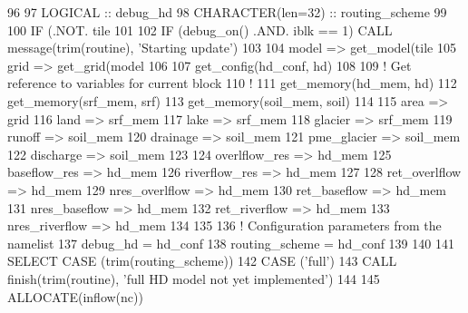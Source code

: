 \begin{DoxyCode}
96 
97     \textcolor{keywordtype}{LOGICAL}           :: debug\_hd
98     \textcolor{keywordtype}{CHARACTER(len=32)} :: routing\_scheme
99 
100     \textcolor{keywordflow}{IF} (.NOT. tile%
101 
102     \textcolor{keywordflow}{IF} (debug\_on() .AND. iblk == 1) \textcolor{keyword}{CALL }message(trim(routine), \textcolor{stringliteral}{'Starting update'})
103 
104     model => get\_model(tile%
105     grid => get\_grid(model%
106 
107     get\_config(hd\_conf, hd)
108 
109     \textcolor{comment}{! Get reference to variables for current block}
110     \textcolor{comment}{!}
111     get\_memory(hd\_mem, hd)
112     get\_memory(srf\_mem, srf)
113     get\_memory(soil\_mem, soil)
114 
115     area           => grid                     %
116     land           => srf\_mem  %
117     lake           => srf\_mem  %
118     glacier        => srf\_mem  %
119     runoff         => soil\_mem %
120     drainage       => soil\_mem %
121     pme\_glacier    => soil\_mem %
122     discharge      => soil\_mem %
123 
124     overlflow\_res  => hd\_mem   %
125     baseflow\_res   => hd\_mem   %
126     riverflow\_res  => hd\_mem   %
127 
128     ret\_overlflow  => hd\_mem   %
129     nres\_overlflow => hd\_mem   %
130     ret\_baseflow   => hd\_mem   %
131     nres\_baseflow  => hd\_mem   %
132     ret\_riverflow  => hd\_mem   %
133     nres\_riverflow => hd\_mem   %
134 
135 
136     \textcolor{comment}{! Configuration parameters from the namelist}
137     debug\_hd          = hd\_conf%
138     routing\_scheme    = hd\_conf%
139 
140 
141     \textcolor{keywordflow}{SELECT CASE} (trim(routing\_scheme))
142     \textcolor{keywordflow}{CASE} (\textcolor{stringliteral}{'full'})
143       \textcolor{keyword}{CALL }finish(trim(routine), \textcolor{stringliteral}{'full HD model not yet implemented'})
144 
145       \textcolor{keyword}{ALLOCATE}(inflow(nc))

\end{DoxyCode}
